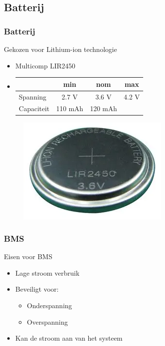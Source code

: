     \subsection{Batterij}
    \begin{frame}
        \frametitle{Batterij}
        Gekozen voor Lithium-ion technologie
        \begin{itemize}
            \item Multicomp LIR2450
            \item 
            \begin{tabular}{|l|c c c|}
                \hline
                 & min & nom & max \\ \hline
                Spanning    & 2.7 V   & 3.6 V   & 4.2 V\\ \hline
                Capaciteit  & 110 mAh & 120 mAh &      \\ \hline
            \end{tabular}            
        \end{itemize}
        \begin{figure}[h]
            \raggedleft
            \includegraphics[scale=0.3]{img/batterij.png}
        \end{figure}
    \end{frame}
        

    \begin{frame}
        \frametitle{BMS}
        Eisen voor BMS
        \begin{itemize}
            \item Lage stroom verbruik
            \item Beveiligt voor:
                \begin{itemize}
                    \item Onderspanning
                    \item Overspanning
                \end{itemize}
            \item Kan de stroom aan van het systeem
            
        \end{itemize}
        
        
    
    \end{frame}


